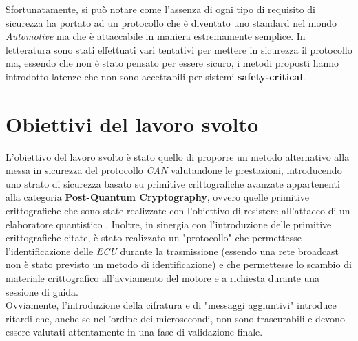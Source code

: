 Sfortunatamente, si può notare come l'assenza di ogni tipo di requisito di sicurezza ha portato ad un protocollo che è diventato uno standard nel mondo \emph{Automotive} ma che è attaccabile in maniera estremamente semplice. In letteratura sono stati effettuati vari tentativi per mettere in sicurezza il protocollo ma, essendo che non è stato pensato per essere sicuro, i metodi proposti hanno introdotto latenze che non sono accettabili per sistemi \textbf{safety-critical}. \cite{bozdal_samie_jennions_2018}

\section{Obiettivi del lavoro svolto} %
L'obiettivo del lavoro svolto è stato quello di proporre un metodo alternativo alla messa in sicurezza del protocollo \emph{CAN} valutandone le prestazioni, introducendo uno strato di sicurezza basato su primitive crittografiche avanzate appartenenti alla categoria \textbf{Post-Quantum Cryptography}, ovvero quelle primitive crittografiche che sono state realizzate con l'obiettivo di resistere all'attacco di un elaboratore quantistico \cite{wikipedia_pqc}. Inoltre, in sinergia con l'introduzione delle primitive crittografiche citate, è stato realizzato un "protocollo" che permettesse l'identificazione delle \emph{ECU} durante la trasmissione (essendo una rete broadcast non è stato previsto un metodo di identificazione) e che permettesse lo scambio di materiale crittografico all'avviamento del motore e a richiesta durante una sessione di guida. \\
Ovviamente, l'introduzione della cifratura e di "messaggi aggiuntivi" introduce ritardi che, anche se nell'ordine dei microsecondi, non sono trascurabili e devono essere valutati attentamente in una fase di validazione finale.

